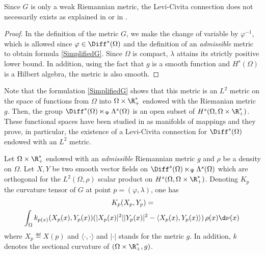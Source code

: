 \begin{remark} Since $G$ is only a weak Riemannian metric, the Levi-Civita connection does not necessarily exists as explained in \cite{em70} or in \cite{SobolevMetricsCurvature}. 
\end{remark}


\begin{proof}
In the definition of the metric $G$, we make the change of variable by $\varphi^{-1}$, which is allowed since $\varphi \in \Diff^{s}(\Omega)$ and the definition of an \textit{admissible} metric to obtain formula \eqref{SimplifiedG}.
Since $\Omega$ is compact, $\lambda$ attains its strictly positive lower bound. In addition, using the fact that $g$ is a smooth function and $H^s(\Omega)$ is a Hilbert algebra, the metric is also smooth.
\end{proof}



Note that the formulation \eqref{SimplifiedG} shows that this metric is an $L^2$ metric on the space of functions from $\Omega$ into $\Omega \times \R_+^*$ endowed with the Riemanian metric $g$. Then, the group $\Diff^{s}(\Omega) \ltimes_\Psi \Lambda^s(\Omega)$ is an open subset of $H^s(\Omega, \Omega \times \R_+^*)$.
These functional spaces have been studied in \cite{em70} as manifolds of mappings and they prove, in particular, the existence of a Levi-Civita connection for $\Diff^{s}(\Omega)$ endowed with an $L^2$ metric.

\begin{theorem}\label{SectionalCurvature}
Let $\Omega \times \R_+^*$ endowed with an \textit{admissible} Riemannian metric $g$ and $\rho$ be a density on $\Omega$. Let $X,Y$ be two smooth vector fields on $\Diff^{s}(\Omega) \ltimes_\Psi \Lambda^s(\Omega)$ which are orthogonal for the $L^2(\Omega,\rho)$ scalar product on $H^s(\Omega, \Omega \times \R_+^*)$. Denoting $K_{p}$ the curvature tensor of $G$ at point $p=(\varphi,\lambda)$, one has
\begin{multline}\label{eq:SectionalCurvature}
K_{p}(X_p,Y_p) = \\ \int_\Omega k_{p(x)}(X_p(x),Y_p(x)) (|X_p(x)|^2| |Y_p(x)|^2 - \langle X_p(x) , Y_p(x) \rangle) \, \rho(x) \d \nu(x) \,
\end{multline}
where  $X_p \eqdef X(p)$ and $\langle \cdot , \cdot \rangle $ and $| \cdot |$ stands for the metric $g$. In addition, $k$ denotes the sectional curvature of $(\Omega \times \R_+^*,g)$.
\end{theorem}

